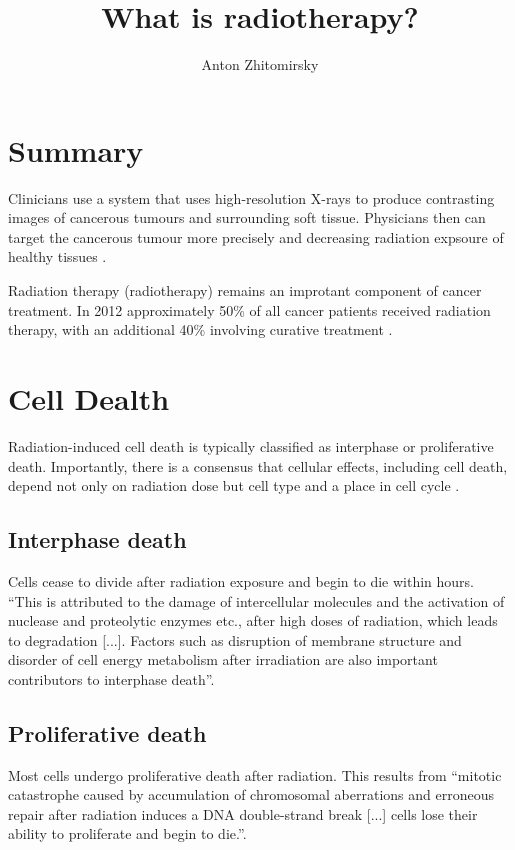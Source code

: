 \documentclass[11pt]{article}
\title{What is radiotherapy?}
\author{Anton Zhitomirsky}
\begin{document}
\maketitle

\section{Summary}

Clinicians use a system that uses high-resolution X-rays to produce contrasting images of cancerous tumours and surrounding soft tissue. Physicians then can target the cancerous tumour more precisely and decreasing radiation expsoure of healthy tissues \cite{radiotherapy-basic-concepts}.

Radiation therapy (radiotherapy) remains an improtant component of cancer treatment. In 2012 approximately 50\% of all cancer patients received radiation therapy, with an additional 40\% involving curative treatment \cite{radiotherapy-advances}.

\section{Cell Dealth}

Radiation-induced cell death is typically classified as interphase or proliferative death. Importantly, there is a consensus that cellular effects, including cell death, depend not only on radiation dose but cell type and a place in cell cycle \cite{cell-death}.

\subsection{Interphase death}

Cells cease to divide after radiation exposure and begin to die within hours. ``This is attributed to the damage of intercellular molecules and the activation of nuclease and proteolytic enzymes etc., after high doses of radiation, which leads to degradation [...]. Factors such as disruption of membrane structure and disorder of cell energy metabolism after irradiation are also important contributors to interphase death''\cite{cell-death}.

\subsection{Proliferative death}

Most cells undergo proliferative death after radiation. This results from ``mitotic catastrophe caused by accumulation of chromosomal aberrations and erroneous repair after radiation induces a DNA double-strand break [...] cells lose their ability to proliferate and begin to die.''\cite{cell-death}.
\end{document}
